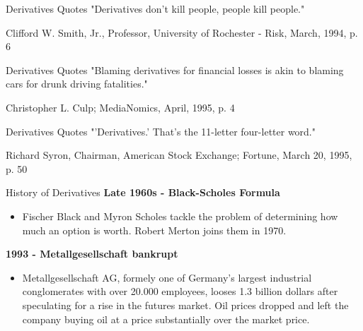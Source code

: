 {Derivatives Quotes}
"Derivatives don't kill people, people kill people."
\begin{flushright}
  \begin{footnotesize}
 Clifford W. Smith, Jr., Professor, University of Rochester - Risk, March, 1994, p. 6
 \end{footnotesize}
\end{flushright}



{Derivatives Quotes}
"Blaming derivatives for financial losses is akin to blaming cars for drunk driving fatalities."
\begin{flushright}
  \begin{footnotesize}
 Christopher L. Culp; MediaNomics, April, 1995, p. 4
 \end{footnotesize}
\end{flushright}




{Derivatives Quotes}
"'Derivatives.' That's the 11-letter four-letter word."
\begin{flushright}
  \begin{footnotesize}
  Richard Syron, Chairman, American Stock Exchange; Fortune, March 20, 1995, p. 50
 \end{footnotesize}
\end{flushright}




{History of Derivatives}
\textbf{Late 1960s - Black-Scholes Formula}\\
\begin{itemize}
  \item Fischer Black and Myron Scholes tackle the problem of determining how much an option is worth. Robert Merton joins them in 1970.
\end{itemize}


\textbf{1993 - Metallgesellschaft bankrupt}
\begin{itemize}
  \item Metallgesellschaft AG, formely one of Germany's largest industrial conglomerates with over 20.000 employees, looses 1.3 billion dollars after speculating for a rise in the futures market. Oil prices dropped and left the company buying oil at a price substantially over the market price.
\end{itemize}


